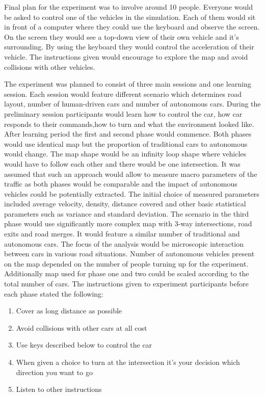\documentclass[11pt,english,twoside]{article}
\begin{document}

Final plan for the experiment was to involve around 10 people. Everyone would be asked to control one of the vehicles in the simulation. Each of them would sit in front of a computer where they could use the keyboard and observe the screen. On the screen they would see a top-down view of their own vehicle and it's surrounding. By using the keyboard they would control the acceleration of their vehicle. The instructions given would encourage to explore the map and avoid collisions with other vehicles.

The experiment was planned to consist of three main sessions and one learning session. Each session would feature different scenario which determines road layout, number of human-driven cars and number of autonomous cars. During the preliminary session participants would learn how to control the car, how car responds to their commands,how to turn and what the environment looked like. 
After learning period the first and second phase would commence. Both phases would use identical map but the proportion of traditional cars to autonomous would change. The map shape would be an infinity loop shape where vehicles would have to follow each other and there would be one intersection. It was assumed that such an approach would allow to measure macro parameters of the traffic as both phases would be comparable and the impact of autonomous vehicles could be potentially extracted. The initial choice of measured parameters included average velocity, density, distance covered and other basic statistical parameters such as variance and standard deviation. The scenario in the third phase would use significantly more complex map with 3-way  intersections, road exits and road merges. It would feature a similar number of traditional and autonomous cars. The focus of the analysis would be microscopic interaction between cars in various road situations. 
Number of autonomous vehicles present on the map depended on the number of people turning up for the experiment. Additionally map used for phase one and two could be scaled according to the total number of cars. The instructions given to experiment participants before each phase stated the following:

\begin{enumerate}
  \item Cover as long distance as possible
  \item Avoid collisions with other cars at all cost
  \item Use keys described below to control the car
  \item When given a choice to turn at the intersection it's your decision which direction you want to go
  \item Listen to other instructions
\end{enumerate}
\end{document}
